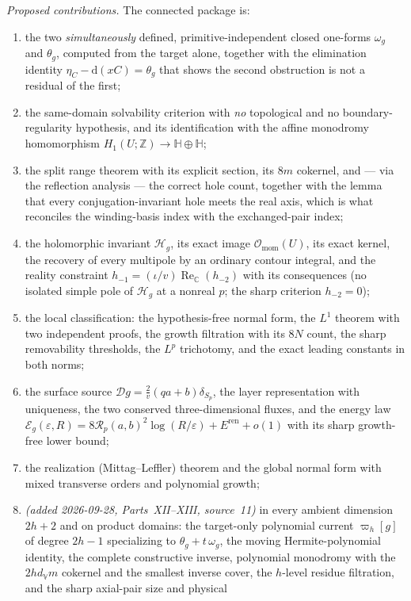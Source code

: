 \documentclass[11pt,a4paper]{article}
\numberwithin{equation}{section}
\theoremstyle{definition}
\theoremstyle{remark}
\theoremstyle{plain}
\newcommand{\HH}{\mathbb H}
\newcommand{\CC}{\mathbb C}
\newcommand{\ZZ}{\mathbb Z}
\DeclareMathOperator{\Rea}{Re}
\newcommand{\ReC}{\Rea_{\CC}}
\newcommand{\Dop}{\mathcal D}
\newcommand{\Omom}{\mathcal O_{\mathrm{mom}}}
\newcommand{\om}{\omega}
\newcommand{\thet}{\theta}
\newcommand{\etaC}{\eta_{C}}
\newcommand{\pot}{C}          %
\newcommand{\Sp}{S_{p}}
\newcommand{\Rp}{\mathcal R_{p}}      %
\newcommand{\Hg}{\mathcal H_{g}}      %
\newcommand{\Eg}{\mathcal E_{g}}
\newcommand{\Eren}{E^{\mathrm{ren}}}
\newcommand{\dd}{\mathrm d}
\newcommand{\VV}{\mathbb V}                       %
\newcommand{\dV}{d_{\VV}}                         %
\newcommand{\cur}{\varpi}                         %
\begin{document}
\emph{Proposed contributions.} The connected package is:
\begin{enumerate}[label=\textup{(\alph*)}]
\item the two \emph{simultaneously} defined, primitive-independent closed
one-forms $\om_g$ and $\thet_g$, computed from the target alone, together
with the elimination identity $\etaC-\dd(x\pot)=\thet_g$ that shows the
second obstruction is not a residual of the first;
\item the same-domain solvability criterion with \emph{no} topological and
no boundary-regularity hypothesis, and its identification with the affine
monodromy homomorphism $H_1(U;\ZZ)\to\HH\oplus\HH$;
\item the split range theorem with its explicit section, its
$8m$ cokernel, and --- via the reflection analysis --- the correct hole
count, together with the lemma that every conjugation-invariant hole meets
the real axis, which is what reconciles the winding-basis index with the
exchanged-pair index;
\item the holomorphic invariant $\Hg$, its exact image $\Omom(U)$, its
exact kernel, the recovery of every multipole by an ordinary contour
integral, and the reality constraint
$h_{-1}=(\iota/v)\ReC(h_{-2})$ with its consequences (no isolated simple
pole of $\Hg$ at a nonreal $p$; the sharp criterion $h_{-2}=0$);
\item the local classification: the hypothesis-free normal form, the $L^1$
theorem with two independent proofs, the growth filtration with its $8N$
count, the sharp removability thresholds, the $L^p$ trichotomy, and the
exact leading constants in both norms;
\item the surface source $\Dop g=\frac2v(qa+b)\delta_{\Sp}$, the layer
representation with uniqueness, the two conserved three-dimensional fluxes,
and the energy law $\Eg(\varepsilon,R)=8\Rp(a,b)^2\log(R/\varepsilon)
+\Eren+o(1)$ with its sharp growth-free lower bound;
\item the realization (Mittag--Leffler) theorem and the global normal form
with mixed transverse orders and polynomial growth;
\item \emph{(added 2026-09-28, Parts~XII--XIII, source~11)} in every ambient
dimension $2h+2$ and on product domains: the target-only polynomial current
$\cur_h[g]$ of degree $2h-1$ specializing to $\thet_g+t\,\om_g$, the moving
Hermite-polynomial identity, the complete constructive inverse, polynomial
monodromy with the $2h\dV m$ cokernel and the smallest inverse cover, the
$h$-level residue filtration, and the sharp axial-pair size and physical

\end{enumerate}
\end{document}
